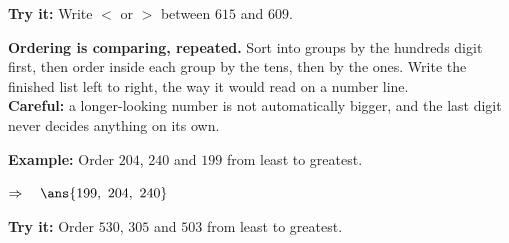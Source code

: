 \documentclass[12pt]{article}
\begin{document}
\begin{tryitbox}
\textbf{Try it:} Write $<$ or $>$ between $615$ and $609$.\\[2pt]
\end{tryitbox}


\begin{formulabox}
\textbf{Ordering is comparing, repeated.} Sort into groups by the hundreds
digit first, then order inside each group by the tens, then by the ones. Write
the finished list left to right, the way it would read on a number line.\\[3pt]
\textbf{Careful:} a longer-looking number is not automatically bigger, and the
last digit never decides anything on its own.
\end{formulabox}

\begin{examplebox}
\textbf{Example:} Order $204$, $240$ and $199$ from least to greatest.

$\Rightarrow\quad \ans{199,\ 204,\ 240}$
\end{examplebox}

\begin{tryitbox}
\textbf{Try it:} Order $530$, $305$ and $503$ from least to greatest.\\[2pt]
\end{tryitbox}
\end{document}
